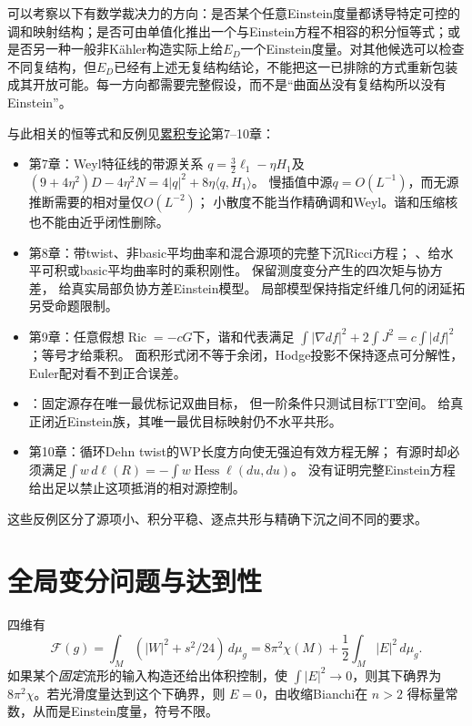 \documentclass[UTF8,a4paper,11pt,fontset=fandol]{ctexart}
\numberwithin{equation}{section}
\theoremstyle{definition}
\newcommand{\Ric}{\operatorname{Ric}}
\newcommand{\dd}{\,d\mu_g}
\begin{document}
可以考察以下有数学裁决力的方向：是否某个任意Einstein度量都诱导特定可控的调和映射结构；是否可由单值化推出一个与Einstein方程不相容的积分恒等式；或是否另一种一般非Kähler构造实际上给$E_D$一个Einstein度量。对其他候选可以检查不同复结构，但$E_D$已经有上述无复结构结论，不能把这一已排除的方式重新包装成其开放可能。每一方向都需要完整假设，而不是“曲面丛没有复结构所以没有Einstein”。

与此相关的恒等式和反例见\href{20260912.tex}{累积专论}第7--10章：
\begin{itemize}
\item 第7章：Weyl特征线的带源关系
$q=\tfrac32\ell_1-\eta H_1$及
$(9+4\eta^2)D-4\eta^2N=4|q|^2+8\eta\langle q,H_1\rangle$。
慢插值中源$q=O(L^{-1})$，而无源推断需要的相对量仅$O(L^{-2})$；
小散度不能当作精确调和Weyl。谐和压缩核也不能由近乎闭性删除。
\item 第8章：带twist、非basic平均曲率和混合源项的完整下沉Ricci方程；
、给水平可积或basic平均曲率时的乘积刚性。
保留测度变分产生的四次矩与协方差，
给真实局部负协方差Einstein模型。
局部模型保持指定纤维几何的闭延拓另受命题限制。
\item 第9章：任意假想$\Ric=-cG$下，谐和代表满足
$\int|\nabla df|^2+2\int J^2=c\int|df|^2$；等号才给乘积。
面积形式闭不等于余闭，Hodge投影不保持逐点可分解性，Euler配对看不到正合误差。
\item {}：固定源存在唯一最优标记双曲目标，
但一阶条件只测试目标TT空间。
给真正闭近Einstein族，其唯一最优目标映射仍不水平共形。
\item 第10章：循环Dehn twist的WP长度方向使无强迫有效方程无解；
有源时却必须满足$\int w\,d\ell(R)=-\int w\operatorname{Hess}\ell(du,du)$。
没有证明完整Einstein方程给出足以禁止这项抵消的相对源控制。
\end{itemize}
这些反例区分了源项小、积分平稳、逐点共形与精确下沉之间不同的要求。

\section{全局变分问题与达到性}
四维有
\begin{equation}\label{eq:F}
\mathcal F(g)=\int_M(|W|^2+s^2/24)\dd
=8\pi^2\chi(M)+\frac12\int_M|E|^2\dd.
\end{equation}
如果某个\emph{固定}流形的输入构造还给出体积控制，使 $\int|E|^2\to0$，则其下确界为 $8\pi^2\chi$。若光滑度量达到这个下确界，则 $E=0$，由收缩Bianchi在 $n>2$ 得标量常数，从而是Einstein度量，符号不限。
\end{document}
